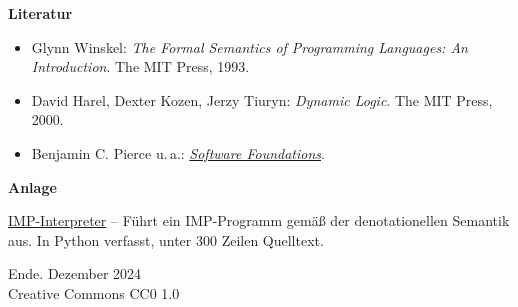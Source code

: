 \documentclass[8pt,fleqn,aspectratio=169]{beamer}
\newcommand{\modest}[1]{{\small\color{gray}#1}}
\newcommand{\strong}[1]{\textsf{\textbf{#1}}}
\newcommand{\parspace}{\vspace{0.8em}}
\begin{document}
\begin{frame}
\strong{Literatur}
\begin{itemize}
\item Glynn Winskel:
  \emph{The Formal Semantics of Programming Languages: An Introduction}.
  The MIT Press, 1993.
\item David Harel, Dexter Kozen, Jerzy Tiuryn:
  \emph{Dynamic Logic}. The MIT Press, 2000.
\item Benjamin C. Pierce u.\,a.:
  \href{https://softwarefoundations.cis.upenn.edu/}{\emph{Software Foundations}}.
\end{itemize}
\end{frame}

\begin{frame}
\strong{Anlage}

\parspace
\href{https://github.com/JohnBSmith/JohnBSmith.github.io/tree/master/Informatik/Programmverifikation/imp}{%
IMP-Interpreter} -- Führt ein IMP-Programm gemäß der denotationellen
Semantik aus. In Python verfasst, unter 300 Zeilen Quelltext.
\end{frame}

\begin{frame}
Ende.
\vfill\hfill\modest{Dezember 2024}\\
\hfill\modest{Creative Commons CC0 1.0}
\end{frame}
\end{document}
